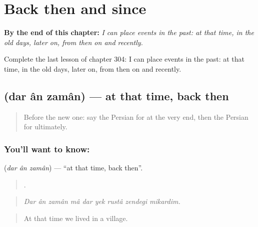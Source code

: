 
\chapter{Back then and since}
\label{ch:fa-back-then-and-since}

\begin{chapteropening}
\textbf{By the end of this chapter:} \emph{I can place events in the past: at that time, in the old days, later on, from then on and recently.}

Complete the last lesson of chapter 304: I can place events in the past: at that time, in the old days, later on, from then on and recently.
\end{chapteropening}

\section[\texorpdfstring{\fa{در} \fa{آن} \fa{زمان} (dar ân zamân)}{در آن زمان (dar ân zamân)}]{   (dar ân zamân) — at that time, back then}

\label{lesson:FA-C304-dar-an-zaman}



\begin{quote}
Before the new one: say the Persian for at the very end, then the Persian for ultimately.
\end{quote}

\subsection*{You'll want to know:   }
\textbf{  } (\emph{dar ân zamân}) — \textquotedblleft{}at that time, back then\textquotedblright{}.

\begin{quote}
        .
\end{quote}

\begin{quote}
\emph{Dar ân zamân mâ dar yek rustâ zendegi mikardim.}
\end{quote}

\begin{quote}
At that time we lived in a village.
\end{quote}

